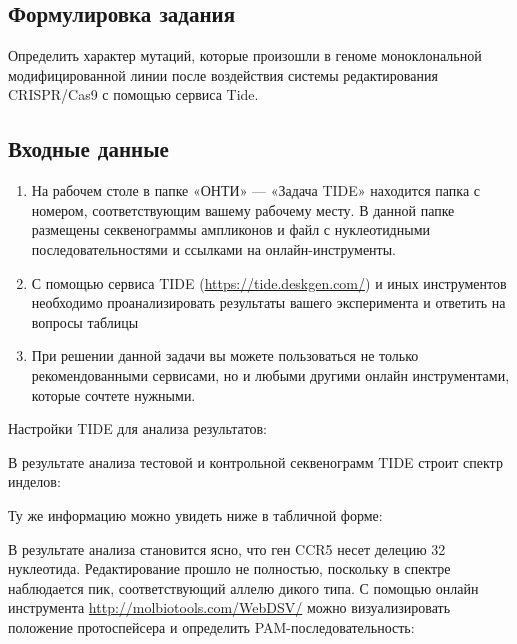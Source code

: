 
\subsection*{Формулировка задания}

Определить характер мутаций, которые произошли в геноме моноклональной модифицированной линии после воздействия системы редактирования CRISPR/Cas9 с помощью сервиса Tide.

\subsection*{Входные данные}

\begin{enumerate}
    \item На рабочем столе в папке «ОНТИ» — «Задача TIDE» находится папка с номером, соответствующим вашему рабочему месту. В данной папке размещены секвенограммы ампликонов и файл с нуклеотидными последовательностями и ссылками на онлайн-инструменты.
    \item С помощью сервиса TIDE (\url{https://tide.deskgen.com/}) и иных инструментов  необходимо проанализировать результаты вашего эксперимента и ответить на вопросы таблицы
    \item При решении данной задачи вы можете пользоваться не только рекомендованными сервисами, но и любыми другими онлайн инструментами, которые сочтете нужными. 
\end{enumerate}

\solutionSection

Настройки TIDE для анализа результатов:


В результате анализа тестовой и контрольной секвенограмм TIDE строит спектр инделов:


Ту же информацию можно увидеть ниже в табличной форме:


В результате анализа становится ясно, что ген CCR5 несет делецию 32 нуклеотида. Редактирование прошло не полностью, поскольку в спектре наблюдается пик, соответствующий аллелю дикого типа.
С помощью онлайн инструмента \url{http://molbiotools.com/WebDSV/} можно визуализировать положение протоспейсера и определить PAM-последовательность:

